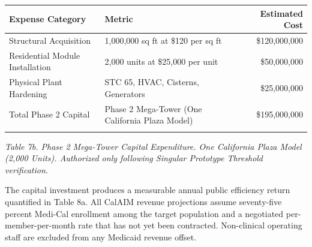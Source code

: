 \documentclass[12pt, letterpaper]{article}
\begin{document}
{\singlespacing
\begin{tabularx}{\textwidth}{@{}lXr@{}}
\toprule
\rowcolor{rowgray}
Expense Category & Metric & Estimated Cost \\
\midrule
Structural Acquisition & 1,000,000 sq ft at \$120 per sq ft & \$120,000,000 \\
\rowcolor{rowgray}
Residential Module Installation & 2,000 units at \$25,000 per unit & \$50,000,000 \\
Physical Plant Hardening & STC 65, HVAC, Cisterns, Generators & \$25,000,000 \\
\midrule
Total Phase 2 Capital & Phase 2 Mega-Tower (One California Plaza Model) & \$195,000,000 \\
\addlinespace[4pt]
\bottomrule
\end{tabularx}\par
\vspace{8pt}
\noindent\textit{Table 7b. Phase 2 Mega-Tower Capital Expenditure. One California Plaza Model (2,000 Units). Authorized only following Singular Prototype Threshold verification.}
\par}
The capital investment produces a measurable annual public efficiency return quantified in Table 8a. All CalAIM revenue projections assume seventy-five percent Medi-Cal enrollment among the target population and a negotiated per-member-per-month rate that has not yet been contracted. Non-clinical operating staff are excluded from any Medicaid revenue offset.
\end{document}
